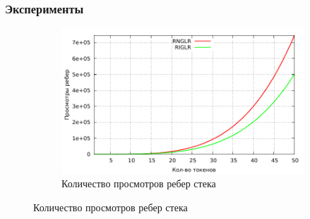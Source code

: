 \documentclass{beamer}
\begin{document}
\begin{frame}[fragile]
	\transwipe[direction=90]
	\frametitle{Эксперименты}
	\begin{figure}[!tbp]
		\centering
		\begin{minipage}[h]{0.3\textwidth}
			\begin{table}[b]
				\centering
				\caption{Кол-во вершин в стеке}
				\label{stack_table}
			\end{table} 			
		\end{minipage}
		\hfill
		\begin{minipage}[h]{0.65\textwidth}
			\begin{figure}[c]
				\includegraphics[width=\textwidth]{pictures/edge_visit.pdf}
				\caption{Количество просмотров ребер стека}
			\end{figure}			
		\end{minipage}
	\end{figure}
\end{frame}
\end{document}

